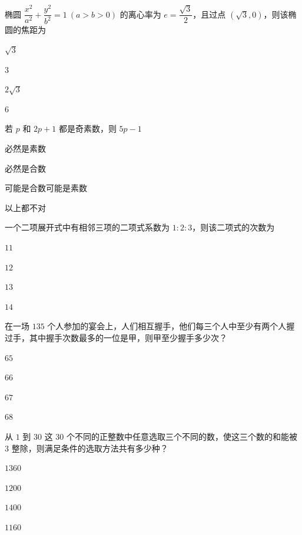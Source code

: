 \documentclass{exam-zh}
\begin{document}
\begin{question}
椭圆 $\dfrac{x^2}{a^2}+\dfrac{y^2}{b^2}=1\ (a>b>0)$ 的离心率为 $e=\dfrac{\sqrt{3}}{2}$，且过点 $\left(\sqrt{3},0\right)$，则该椭圆的焦距为 \paren[]
\begin{choices}
  \item $\sqrt{3}$
  \item $3$
  \item $2\sqrt{3}$
  \item $6$
\end{choices}
\end{question}

\begin{question}
若 $p$ 和 $2p+1$ 都是奇素数，则 $5p-1$ \paren[]
\begin{choices}
  \item 必然是素数
  \item 必然是合数
  \item 可能是合数可能是素数
  \item 以上都不对
\end{choices}
\end{question}

\begin{question}
一个二项展开式中有相邻三项的二项式系数为 $1:2:3$，则该二项式的次数为 \paren[]
\begin{choices}
  \item $11$
  \item $12$
  \item $13$
  \item $14$
\end{choices}
\end{question}

\begin{question}
在一场 $135$ 个人参加的宴会上，人们相互握手，他们每三个人中至少有两个人握过手，其中握手次数最多的一位是甲，则甲至少握手多少次？\paren[]
\begin{choices}
  \item $65$
  \item $66$
  \item $67$
  \item $68$
\end{choices}
\end{question}

\begin{question}
从 $1$ 到 $30$ 这 $30$ 个不同的正整数中任意选取三个不同的数，使这三个数的和能被 $3$ 整除，则满足条件的选取方法共有多少种？\paren[]
\begin{choices}
  \item $1360$
  \item $1200$
  \item $1400$
  \item $1160$
\end{choices}
\end{question}
\end{document}

